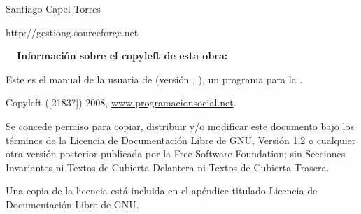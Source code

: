 \clearpage\setcounter{page}{1}\pagestyle{FirstPage}
\thispagestyle{Primeraprimerapagina}

\bigskip

{\bfseries \appname \appversion}

{\raggedleft \appdescription \par}

{\raggedleft \appreleasedate \par}


Santiago Capel Torres

http://gestiong.sourceforge.net



{\bfseries
\ \ Información sobre el copyleft de esta obra:}


\bigskip

Este es el manual de la usuaria de \appname (versión \appversion, \appreleasedate), un programa para la \appdescription.

Copyleft (\textsf{[2183?]}) 2008,
\href{http://www.programacionsocial.net/}{www.programacionsocial.net}.

Se concede permiso para copiar, distribuir y/o modificar este documento
bajo los términos de la Licencia de Documentación Libre de GNU,
Versión 1.2 o cualquier otra versión posterior publicada por la
Free Software Foundation; sin Secciones Invariantes ni Textos de
Cubierta Delantera ni Textos de Cubierta Trasera. 

Una copia de la licencia está incluida en el apéndice titulado
Licencia de Documentación Libre de GNU.


\clearpage

\setcounter{tocdepth}{10}
\renewcommand\contentsname{Índice de contenido}
\tableofcontents
